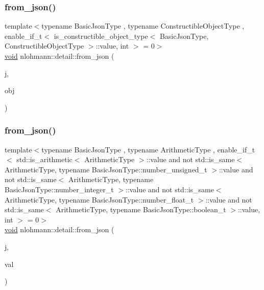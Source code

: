 \mbox{\label{namespacenlohmann_1_1detail_a5b24896e5f5db6af06d939dde4b63fe1}} 
\subsubsection{\texorpdfstring{from\_json()}{from\_json()}\hspace{0.1cm}{\footnotesize\ttfamily [13/18]}}
{\footnotesize\ttfamily template$<$typename Basic\+Json\+Type , typename Constructible\+Object\+Type , enable\+\_\+if\+\_\+t$<$ is\+\_\+constructible\+\_\+object\+\_\+type$<$ Basic\+Json\+Type, Constructible\+Object\+Type $>$\+::value, int $>$  = 0$>$ \\
\mbox{\hyperlink{namespacenlohmann_1_1detail_a59fca69799f6b9e366710cb9043aa77d}{void}} nlohmann\+::detail\+::from\+\_\+json (\begin{DoxyParamCaption}\item[{const Basic\+Json\+Type \&}]{j,  }\item[{Constructible\+Object\+Type \&}]{obj }\end{DoxyParamCaption})}

\mbox{\label{namespacenlohmann_1_1detail_a839b0ab50d2c9bce669068f56bc41202}} 
\subsubsection{\texorpdfstring{from\_json()}{from\_json()}\hspace{0.1cm}{\footnotesize\ttfamily [14/18]}}
{\footnotesize\ttfamily template$<$typename Basic\+Json\+Type , typename Arithmetic\+Type , enable\+\_\+if\+\_\+t$<$ std\+::is\+\_\+arithmetic$<$ Arithmetic\+Type $>$\+::value and not std\+::is\+\_\+same$<$ Arithmetic\+Type, typename Basic\+Json\+Type\+::number\+\_\+unsigned\+\_\+t $>$\+::value and not std\+::is\+\_\+same$<$ Arithmetic\+Type, typename Basic\+Json\+Type\+::number\+\_\+integer\+\_\+t $>$\+::value and not std\+::is\+\_\+same$<$ Arithmetic\+Type, typename Basic\+Json\+Type\+::number\+\_\+float\+\_\+t $>$\+::value and not std\+::is\+\_\+same$<$ Arithmetic\+Type, typename Basic\+Json\+Type\+::boolean\+\_\+t $>$\+::value, int $>$  = 0$>$ \\
\mbox{\hyperlink{namespacenlohmann_1_1detail_a59fca69799f6b9e366710cb9043aa77d}{void}} nlohmann\+::detail\+::from\+\_\+json (\begin{DoxyParamCaption}\item[{const Basic\+Json\+Type \&}]{j,  }\item[{Arithmetic\+Type \&}]{val }\end{DoxyParamCaption})}

